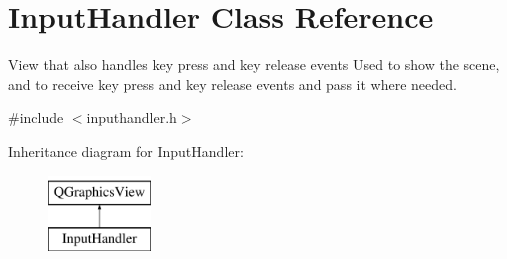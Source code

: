 \hypertarget{classInputHandler}{\section{Input\-Handler Class Reference}
\label{classInputHandler}
}


View that also handles key press and key release events Used to show the scene, and to receive key press and key release events and pass it where needed.  




{\ttfamily \#include $<$inputhandler.\-h$>$}

Inheritance diagram for Input\-Handler\-:\begin{figure}[H]
\begin{center}
\leavevmode
\includegraphics[height=2.000000cm]{classInputHandler}
\end{center}
\end{figure}
